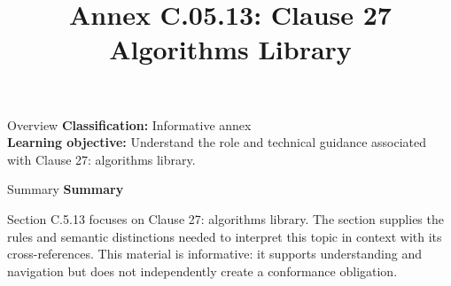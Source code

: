 \documentclass[10pt,letterpaper]{article}
\title{Annex C.05.13: Clause 27 Algorithms Library}
\author{}
\date{}
\begin{document}
\maketitle
\begin{CornellOverviewBox}{Overview}
\textbf{Classification:} Informative annex\\[2pt]
\textbf{Learning objective:} Understand the role and technical guidance associated with Clause 27: algorithms library.
\end{CornellOverviewBox}\begin{CornellSummaryBox}{Summary}
{\sffamily\bfseries\color{Accent} Summary}\par\vspace{3pt}Section C.5.13 focuses on Clause 27: algorithms library. The section supplies the rules and semantic distinctions needed to interpret this topic in context with its cross-references. This material is informative: it supports understanding and navigation but does not independently create a conformance obligation.
\end{CornellSummaryBox}
\end{document}
